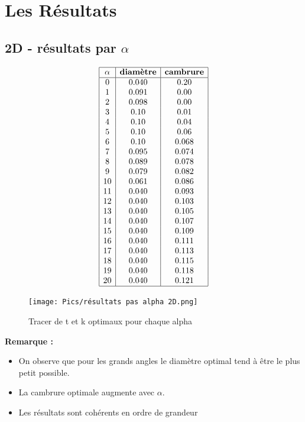 \documentclass[conference]{IEEEtran}
\begin{document}
\IEEEpeerreviewmaketitle
\section{Les Résultats}

\subsection{2D - résultats par $\alpha$}

\[
\begin{array}{|c|c|c|}
    \hline
    \textbf{$\alpha$} & \textbf{diamètre} & \textbf{cambrure}\\
    \hline
    0 & 0.040 & 0.20 \\
    1 & 0.091 & 0.00 \\
    2 & 0.098 & 0.00 \\
    3 & 0.10 & 0.01  \\
    4 & 0.10 & 0.04  \\
    5 & 0.10 & 0.06  \\
    6 & 0.10 & 0.068  \\
    7 & 0.095 & 0.074 \\
    8 & 0.089 & 0.078 \\
    9 & 0.079 & 0.082 \\
    10 & 0.061 & 0.086 \\
    11 & 0.040 & 0.093 \\
    12 & 0.040 & 0.103 \\
    13 & 0.040 & 0.105 \\
    14 & 0.040 & 0.107 \\
    15 & 0.040 & 0.109 \\
    16 & 0.040 & 0.111 \\
    17 & 0.040 & 0.113 \\
    18 & 0.040 & 0.115 \\
    19 & 0.040 & 0.118 \\
    20 & 0.040 & 0.121 \\
    \hline
\end{array}
\]

\begin{figure}[H]
    \centering
    \texttt{[image: Pics/résultats pas alpha 2D.png]}  
    \caption{Tracer de t et k optimaux pour chaque alpha}
    \label{fig:t,k,alpha 2d}
\end{figure}

    \textbf{Remarque :} 
    \begin{itemize}
        \item On observe que pour les grands angles le diamètre optimal tend à être le plus petit possible.
        \item La cambrure optimale augmente avec $\alpha$.
        \item Les résultats sont cohérents en ordre de grandeur
    \end{itemize}
\end{document}
